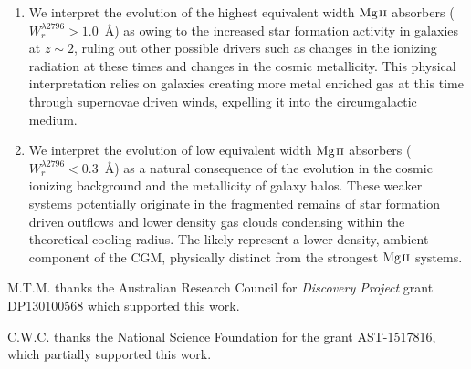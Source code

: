 \documentclass[iop,apj,numberedappendix,appendixfloats,twocolappendix]{emulateapj}
\begin{document}
\begin{enumerate}
\item We interpret the evolution of the highest equivalent width ${\hbox{{\rm Mg}\kern 0.1em{\sc ii}}}$ absorbers ($W_r^{\lambda2796} > 1.0$~{\AA}) as owing to the increased star formation activity in galaxies at $z \sim 2$, ruling out other possible drivers such as changes in the ionizing radiation at these times and changes in the cosmic metallicity. This physical interpretation relies on galaxies creating more metal enriched gas at this time through supernovae driven winds, expelling it into the circumgalactic medium. 
\item We interpret the evolution of low equivalent width ${\hbox{{\rm Mg}\kern 0.1em{\sc ii}}}$ absorbers ($W_r^{\lambda2796} < 0.3$~{\AA}) as a natural consequence of the evolution in the cosmic ionizing background and the metallicity of galaxy halos. These weaker systems potentially originate in the fragmented remains of star formation driven outflows and lower density gas clouds condensing within the theoretical cooling radius. The likely represent a lower density, ambient component of the CGM, physically distinct from the strongest ${\hbox{{\rm Mg}\kern 0.1em{\sc ii}}}$ systems. 
\end{enumerate}

M.T.M. thanks the Australian Research Council for \textsl{Discovery Project} grant DP130100568 which supported this work.

C.W.C. thanks the National Science Foundation for the grant AST-1517816, which partially supported this work.



\end{document}
